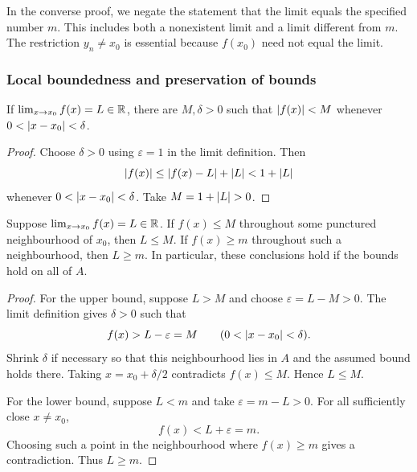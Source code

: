 \documentclass[11pt,a4paper]{amsart}
\begin{document}
\begin{remark}
  In the converse proof, we negate the statement that the limit equals
  the specified number \(m\). This includes both a nonexistent limit
  and a limit different from \(m\). The restriction \(y_n\neq x_0\)
  is essential because \(f(x_0)\) need not equal the limit.
\end{remark}

\subsubsection{Local boundedness and preservation of bounds}

\begin{theorem}\label{thm:function-local-bound}
  If \(\lim_{x\to x_0}f(x)=L\in\mathbb{R}\), there are \(M,\delta>0\)
  such that \(\lvert f(x)\rvert<M\) whenever \(0<\lvert x-x_0\rvert<\delta\).
\end{theorem}

\begin{proof}
  Choose \(\delta>0\) using \(\varepsilon=1\) in the limit
  definition. Then
  \[
    \lvert f(x)\rvert\leq\lvert f(x)-L\rvert+\lvert L\rvert<1+\lvert L\rvert
  \]
  whenever \(0<\lvert x-x_0\rvert<\delta\). Take \(M=1+\lvert L\rvert>0\).
\end{proof}

\begin{theorem}
  Suppose \(\lim_{x\to x_0}f(x)=L\in\mathbb{R}\).
  If \(f(x)\leq M\) throughout some punctured neighbourhood of
  \(x_0\), then \(L\leq M\). If \(f(x)\geq m\) throughout
  such a neighbourhood, then \(L\geq m\).
  In particular, these conclusions hold if the bounds hold on all of \(A\).
\end{theorem}

\begin{proof}
  For the upper bound, suppose \(L>M\) and choose
  \(\varepsilon=L-M>0\). The limit definition gives \(\delta>0\)
  such that
  \[
    f(x)>L-\varepsilon=M\qquad(0<\lvert x-x_0\rvert<\delta).
  \]
  Shrink \(\delta\) if necessary so that this neighbourhood lies
  in \(A\) and the assumed bound holds there. Taking
  \(x=x_0+\delta/2\) contradicts \(f(x)\leq M\). Hence \(L\leq M\).

  For the lower bound, suppose \(L<m\) and take
  \(\varepsilon=m-L>0\). For all sufficiently close \(x\neq x_0\),
  \[
    f(x)<L+\varepsilon=m.
  \]
  Choosing such a point in the neighbourhood where \(f(x)\geq m\)
  gives a contradiction. Thus \(L\geq m\).
\end{proof}
\end{document}

